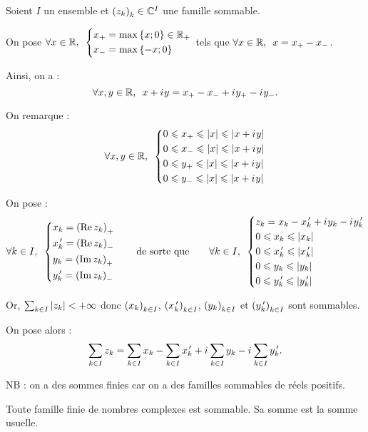 \begin{defi}
Soient \(I\) un ensemble et \(\left(z_k\right)_k\in\mathbb{C}^I\) une famille sommable.

On pose \(\quantifs{\forall x\in\R}\begin{dcases}
x_+=\max\accol{x;0}\in\Rp \\
x_-=\max\accol{-x;0}
\end{dcases}\) tels que \(\quantifs{\forall x\in\R}x=x_+-x_-\).

Ainsi, on a : \[\quantifs{\forall x,y\in\R}x+\i y=x_+-x_-+\i y_+-\i y_-.\]

On remarque : \[\quantifs{\forall x,y\in\R}\begin{dcases}
0\leq x_+\leq\abs{x}\leq\abs{x+\i y} \\
0\leq x_-\leq\abs{x}\leq\abs{x+\i y} \\
0\leq y_+\leq\abs{x}\leq\abs{x+\i y} \\
0\leq y_-\leq\abs{x}\leq\abs{x+\i y}
\end{dcases}\]

On pose : \[\quantifs{\forall k\in I}\begin{dcases}
x_k=\paren{\Re z_k}_+ \\
x_k\prim=\paren{\Re z_k}_- \\
y_k=\paren{\Im z_k}_+ \\
y_k\prim=\paren{\Im z_k}_-
\end{dcases}\qquad\text{de sorte que}\qquad\quantifs{\forall k\in I}\begin{dcases}
z_k=x_k-x_k\prim+\i y_k-\i y_k\prim \\
0\leq x_k\leq\abs{x_k} \\
0\leq x_k\prim\leq\abs{x_k\prim} \\
0\leq y_k\leq\abs{y_k} \\
0\leq y_k\prim\leq\abs{y_k\prim}
\end{dcases}\]

Or, \(\sum_{k\in I}\left\lvert z_k\right\rvert<+\infty\) donc \(\left(x_k\right)_{k\in I}\), \(\left(x_k^{\,\prime}\right)_{k\in I}\), \(\left(y_k\right)_{k\in I}\) et \(\left(y_k^{\,\prime}\right)_{k\in I}\) sont sommables.

On pose alors : \[\sum_{k\in I}z_k=\sum_{k\in I}x_k-\sum_{k\in I}x_k^{\,\prime}+i\mkern1mu\sum_{k\in I}y_k-i\mkern1mu\sum_{k\in I}y_k^{\,\prime}.\]

NB : on a des sommes finies car on a des familles sommables de réels positifs.
\end{defi}

\begin{ex}
Toute famille finie de nombres complexes est sommable. Sa somme est la somme usuelle.
\end{ex}


